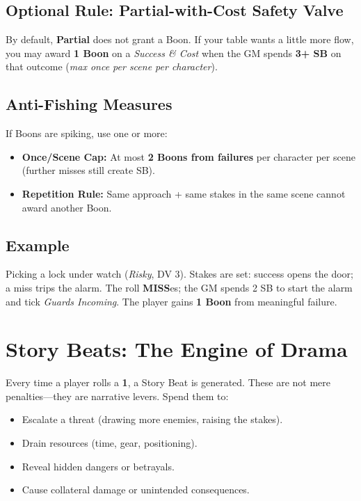 \subsection{Optional Rule: Partial-with-Cost Safety Valve}
By default, \textbf{Partial} does not grant a Boon. If your table wants a little more flow, you may award \textbf{1 Boon} on a \emph{Success \& Cost} when the GM spends \textbf{3+ SB} on that outcome (\emph{max once per scene per character}).

\subsection{Anti-Fishing Measures}
If Boons are spiking, use one or more:
\begin{itemize}
  \item \textbf{Once/Scene Cap:} At most \textbf{2 Boons from failures} per character per scene (further misses still create SB).
  \item \textbf{Repetition Rule:} Same approach + same stakes in the same scene cannot award another Boon.
\end{itemize}

\subsection{Example}
Picking a lock under watch (\emph{Risky}, DV 3). Stakes are set: success opens the door; a miss trips the alarm. The roll \textbf{MISS}es; the GM spends 2 SB to start the alarm and tick \emph{Guards Incoming}. The player gains \textbf{1 Boon} from meaningful failure.

\section{Story Beats: The Engine of Drama}

Every time a player rolls a \textbf{1}, a Story Beat is generated. These are not mere penalties---they are narrative levers. Spend them to:

\begin{itemize}
    \item Escalate a threat (drawing more enemies, raising the stakes).
    \item Drain resources (time, gear, positioning).
    \item Reveal hidden dangers or betrayals.
    \item Cause collateral damage or unintended consequences.
\end{itemize}

